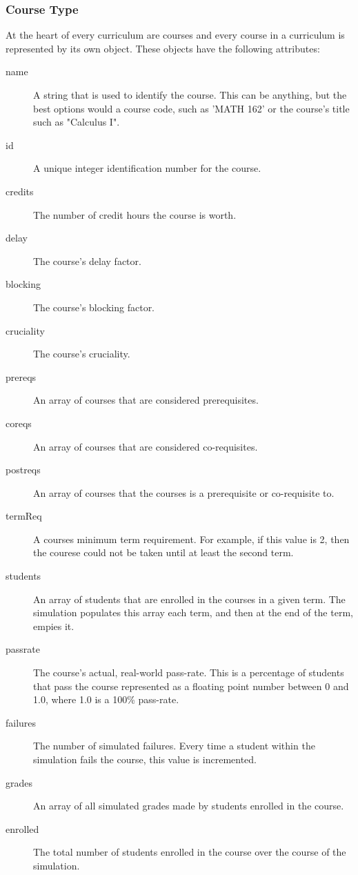 \documentclass[botnum, fleqn]{unmeethesis}
\begin{document}
    \subsubsection{Course Type}
      At the heart of every curriculum are courses and every course in a curriculum is represented by its own object. These objects have the following attributes:

      \begin{description}
        \item [name] A string that is used to identify the course. This can be anything, but the best options would a course code, such as 'MATH 162' or the course's title such as "Calculus I".
        \item [id] A unique integer identification number for the course.
        \item [credits] The number of credit hours the course is worth.
        \item [delay] The course's delay factor.
        \item [blocking] The course's blocking factor.
        \item [cruciality] The course's cruciality.
        \item [prereqs] An array of courses that are considered prerequisites.
        \item [coreqs] An array of courses that are considered co-requisites.
        \item [postreqs] An array of courses that the courses is a prerequisite or co-requisite to.
        \item [termReq] A courses minimum term requirement. For example, if this value is 2, then the courese could not be taken until at least the second term.
        \item [students] An array of students that are enrolled in the courses in a given term. The simulation populates this array each term, and then at the end of the term, empies it.
        \item [passrate] The course's actual, real-world pass-rate. This is a percentage of students that pass the course represented as a floating point number between 0 and 1.0, where 1.0 is a 100\% pass-rate.
        \item [failures] The number of simulated failures. Every time a student within the simulation fails the course, this value is incremented.
        \item [grades] An array of all simulated grades made by students enrolled in the course.
        \item [enrolled] The total number of students enrolled in the course over the course of the simulation.

\end{description}
\end{document}
